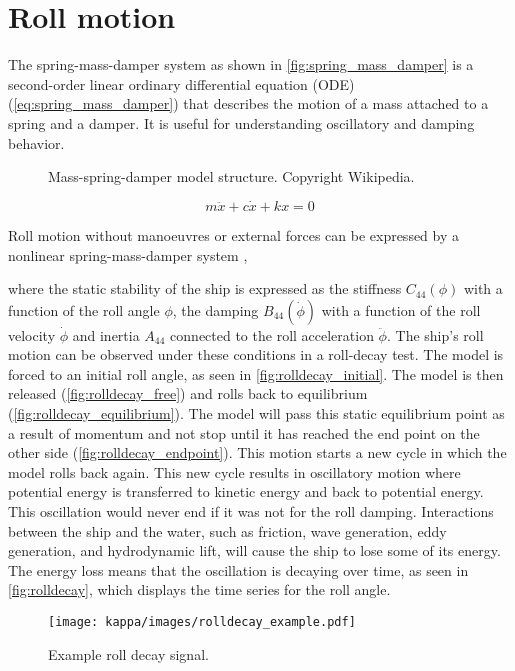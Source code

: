 \section{Roll motion} \label{sec:roll}
The spring-mass-damper system as shown in \autoref{fig:spring_mass_damper} is a second-order linear ordinary differential equation (ODE) (\autoref{eq:spring_mass_damper}) that describes the motion of a mass attached to a spring and a damper. It is useful for understanding oscillatory and damping behavior.
\begin{figure}[h]
    \centering
    
    \caption{Mass-spring-damper model structure. Copyright Wikipedia.}
    \label{fig:spring_mass_damper}
\end{figure}
\begin{equation} \label{eq:spring_mass_damper}
m\ddot{x} + c\dot{x} + kx = 0
\end{equation}

Roll motion without manoeuvres or external forces can be expressed by a nonlinear spring-mass-damper system \cite{himenoPredictionShipRoll1981},

where the static stability of the ship is expressed as the stiffness $C_{44}(\phi)$ with a function of the roll angle $\phi$, the damping $B_{44}(\dot{\phi})$ with a function of the roll velocity $\dot{\phi}$ and inertia $A_{44}$ connected to the roll acceleration $\ddot{\phi}$. The ship's roll motion can be observed under these conditions in a roll-decay test. The model is forced to an initial roll angle, as seen in \autoref{fig:rolldecay_initial}. The model is then released (\autoref{fig:rolldecay_free}) and rolls back to equilibrium (\autoref{fig:rolldecay_equilibrium}). The model will pass this static equilibrium point as a result of momentum and not stop until it has reached the end point on the other side (\autoref{fig:rolldecay_endpoint}). This motion starts a new cycle in which the model rolls back again. This new cycle results in oscillatory motion where potential energy is transferred to kinetic energy and back to potential energy.
This oscillation would never end if it was not for the roll damping. Interactions between the ship and the water, such as friction, wave generation, eddy generation, and hydrodynamic lift, will cause the ship to lose some of its energy. The energy loss means that the oscillation is decaying over time, as seen in \autoref{fig:rolldecay}, which displays the time series for the roll angle.

\begin{figure}[H]
    \centering
    \texttt{[image: kappa/images/rolldecay\_example.pdf]}
    \caption{Example roll decay signal.}
    \label{fig:rolldecay}
\end{figure}

